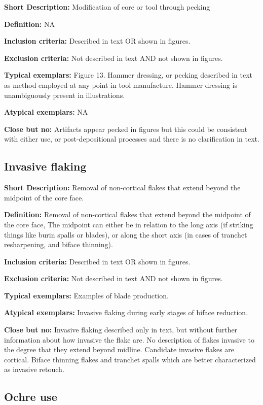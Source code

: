 \documentclass[
]{article}
\begin{document}
\textbf{Short Description:} Modification of core or tool through pecking

\textbf{Definition:} NA

\textbf{Inclusion criteria:} Described in text OR shown in figures.

\textbf{Exclusion criteria:} Not described in text AND not shown in
figures.

\textbf{Typical exemplars:} Figure 13. Hammer dressing, or pecking
described in text as method employed at any point in tool manufacture.
Hammer dressing is unambiguously present in illustrations.

\textbf{Atypical exemplars:} NA

\textbf{Close but no:} Artifacts appear pecked in figures but this could
be consistent with either use, or post-depositional processes and there
is no clarification in text.

\hypertarget{invasive-flaking}{%
\subsection{Invasive flaking}\label{invasive-flaking}}

\textbf{Short Description:} Removal of non-cortical flakes that extend
beyond the midpoint of the core face.

\textbf{Definition:} Removal of non-cortical flakes that extend beyond
the midpoint of the core face, The midpoint can either be in relation to
the long axis (if striking things like burin spalls or blades), or along
the short axis (in cases of tranchet resharpening, and biface thinning).

\textbf{Inclusion criteria:} Described in text OR shown in figures.

\textbf{Exclusion criteria:} Not described in text AND not shown in
figures.

\textbf{Typical exemplars:} Examples of blade production.

\textbf{Atypical exemplars:} Invasive flaking during early stages of
biface reduction.

\textbf{Close but no:} Invasive flaking described only in text, but
without further information about how invasive the flake are. No
description of flakes invasive to the degree that they extend beyond
midline. Candidate invasive flakes are cortical. Biface thinning flakes
and tranchet spalls which are better characterized as invasive retouch.

\hypertarget{ochre-use}{%
\subsection{Ochre use}\label{ochre-use}}
\end{document}
